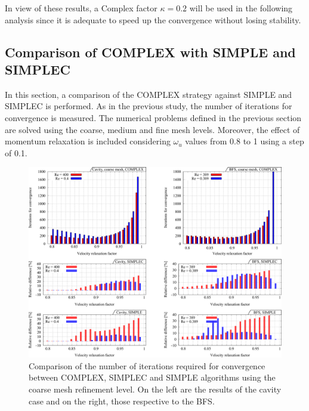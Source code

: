 \documentclass[final,3p,times,11pt,onecolumn]{myElsarticle}
\numberwithin{equation}{section}
\begin{document}
In view of these results, a Complex factor $\kappa = 0.2$ will be used in the following analysis since it is adequate to speed up the convergence without losing stability. %

 
\subsection{Comparison of COMPLEX with SIMPLE and SIMPLEC}
In this section, a comparison of the COMPLEX strategy against SIMPLE and SIMPLEC is performed.
As in the previous study, the number of iterations for convergence is measured. The numerical problems defined in the previous section are solved using the coarse, medium and fine mesh levels. Moreover, the effect of momentum relaxation is included considering $\omega_u$ values from 0.8 to 1 using a step of 0.1.
\begin{figure}[t!]
\centering
\includegraphics[width=17cm]{fig/Results/complexCoarse.pdf}
\caption{Comparison of the number of iterations required for convergence between COMPLEX, SIMPLEC and SIMPLE algorithms using the coarse mesh refinement level. On the left are the results of the cavity case and on the right, those respective to the BFS.}
\label{Fig:complexCoarse}
\end{figure}
\end{document}
